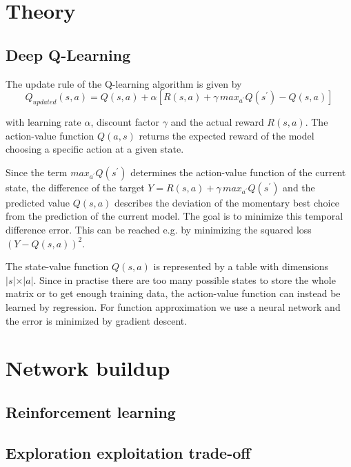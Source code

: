\documentclass[a4paper ,12pt]{report}
\begin{document}
	
	\tableofcontents
	
	\chapter{Theory}
	
	
	\section{Deep Q-Learning}
	The update rule of the Q-learning algorithm is given by
	\begin{equation}
	Q_{updated}(s,a) = Q(s,a) + \alpha\left[R(s,a) + \gamma \, max_{a^{\prime}} Q\left(s^{\prime}\right) - Q(s,a)\right]
	\end{equation}

	with learning rate $\alpha$, discount factor $\gamma$ and the actual reward $R(s,a)$. The action-value function $Q(a,s)$ returns the expected reward of the model choosing a specific action at a given state.
	
	Since the term $max_{a^{\prime}} Q\left(s^{\prime}\right)$ determines the action-value function of the current state, the difference of the target $Y = R(s,a) + \gamma \, max_{a^{\prime}} Q\left(s^{\prime}\right)$ and the predicted value $Q(s,a)$ describes the deviation of the momentary best choice from the prediction of the current model. The goal is to minimize this temporal difference error. This can be reached e.g. by minimizing the squared loss $(Y-Q(s,a))^2$.\cite{UBHD-68505368}
	
	\vspace{0.5cm}
	
	The state-value function $Q(s, a)$ is represented by a table with dimensions $\lvert s \lvert \times \lvert a \lvert $. Since in practise there are too many possible states to store the whole matrix or to get enough training data, the action-value function can instead be learned by regression. For function approximation we use a neural network and the error is minimized by gradient descent. \cite{Lecture}
	
	\chapter{Network buildup}
	
	\section{Reinforcement learning}
	
	\section{Exploration exploitation trade-off}
	
\end{document}
